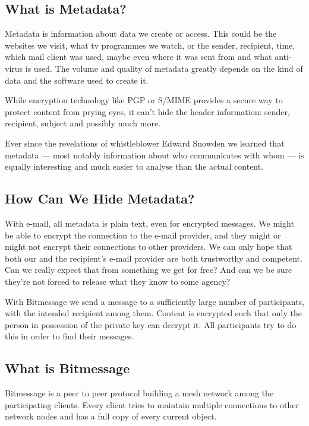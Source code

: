 \documentclass{bfh}
\begin{document}
  \subsection{What is Metadata?}

  Metadata is information about data we create or access. This could be the websites we visit, what tv programmes we watch, or the sender, recipient, time, which mail client was used, maybe even where it was sent from and what anti-virus is used. The volume and quality of metadata greatly depends on the kind of data and the software used to create it.

  While encryption technology like \ac{PGP} or \acs{S/MIME} provides a secure way to protect content from prying eyes, it can't hide the header information: sender, recipient, subject and possibly much more.

  Ever since the revelations of whistleblower Edward Snowden we learned that metadata --- most notably information about who communicates with whom --- is equally interesting and much easier to analyse than the actual content.\cite{guardian:metadata}

  \subsection{How Can We Hide Metadata?}

  With e-mail, all metadata is plain text, even for encrypted messages. We might be able to encrypt the connection to the e-mail provider, and they might or might not encrypt their connections to other providers. We can only hope that both our and the recipient's e-mail provider are both trustworthy and competent. Can we really expect that from something we get for free? And can we be sure they're not forced to release what they know to some agency?\cite{yale:nsl}

  With Bitmessage we send a message to a sufficiently large number of participants, with the intended recipient among them. Content is encrypted such that only the person in possession of the private key can decrypt it. All participants try to do this in order to find their messages.

  \subsection{What is Bitmessage}
  
  Bitmessage is a peer to peer protocol building a mesh network among the participating clients. Every client tries to maintain multiple connections to other network nodes and has a full copy of every current object.
  
\end{document}
